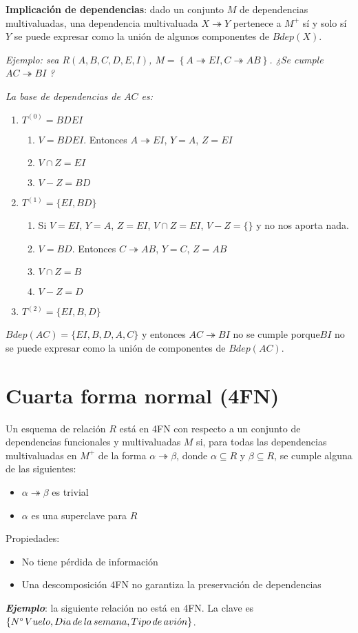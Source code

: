\documentclass[a4paper, twoside]{article}
\begin{document}
\textbf{Implicación de dependencias}: dado un conjunto $M$ de dependencias
multivaluadas, una dependencia multivaluada $X\twoheadrightarrow Y$
pertenece a $M^{+}$ sí y solo sí $Y$ se puede expresar como la unión
de algunos componentes de $Bdep(X)$.

\emph{Ejemplo: sea $R(A,B,C,D,E,I)$, $M=\left\{ A\twoheadrightarrow EI,C\twoheadrightarrow AB\right\} $.
¿Se cumple }$AC\twoheadrightarrow BI$ \emph{?}

\emph{La base de dependencias de $AC$ es:}
\begin{enumerate}
\item $T^{(0)}=BDEI$

\begin{enumerate}
\item $V=BDEI$. Entonces $A\twoheadrightarrow EI$, $Y=A$, $Z=EI$
\item $V\cap Z=EI$
\item $V-Z=BD$
\end{enumerate}
\item $T^{(1)}=\{EI,BD\}$

\begin{enumerate}
\item Si $V=EI$, $Y=A$, $Z=EI$, $V\cap Z=EI$, $V-Z=\{\}$ y no nos aporta
nada.
\item $V=BD$. Entonces $C\twoheadrightarrow AB$, $Y=C$, $Z=AB$
\item $V\cap Z=B$
\item $V-Z=D$
\end{enumerate}
\item $T^{(2)}=\{EI,B,D\}$
\end{enumerate}
$Bdep(AC)=\{EI,B,D,A,C\}$ y entonces $AC\twoheadrightarrow BI$ no
se cumple porque$BI$ no se puede expresar como la unión de componentes
de $Bdep(AC)$.


\section{Cuarta forma normal (4FN)}

Un esquema de relación $R$ está en 4FN con respecto a un conjunto
de dependencias funcionales y multivaluadas $M$ si, para todas las
dependencias multivaluadas en $M^{+}$ de la forma $\alpha\twoheadrightarrow\beta$,
donde $\alpha\subseteq R$ y $\beta\subseteq R$, se cumple alguna
de las siguientes:
\begin{itemize}
\item $\alpha\twoheadrightarrow\beta$ es trivial
\item $\alpha$ es una superclave para $R$ 
\end{itemize}
Propiedades:
\begin{itemize}
\item No tiene pérdida de información
\item Una descomposición 4FN no garantiza la preservación de dependencias
\end{itemize}
\textbf{\emph{Ejemplo}}: la siguiente relación no está en 4FN. La
clave es $\left\{ N\text{\textdegree\,}Vuelo,Dia\, de\, la\, semana,Tipo\, de\, avi\acute{o}n\right\} $. 
\end{document}
